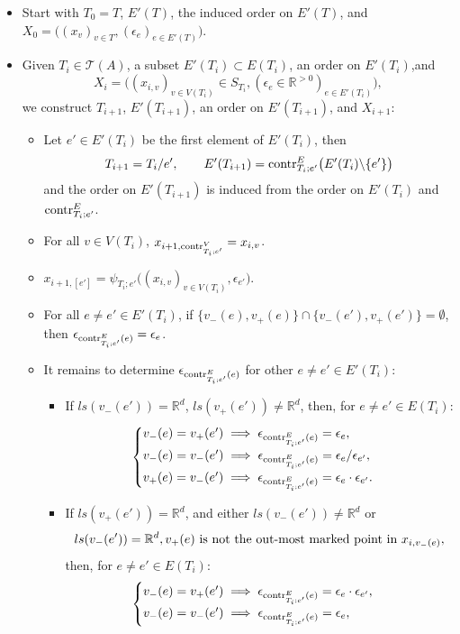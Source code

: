 \documentclass[11pt]{article}
\theoremstyle{definition}
\theoremstyle{remark}
\def\R{\mathbb{R}}
\def\cT{\mathcal{T}}
\def\tn#1{\textnormal{#1}}
\begin{document}
\begin{itemize}
\item Start with $T_0=T$, $E'(T)$, the induced order on $E'(T)$, and $X_0=\big((x_v)_{v\in T},(\epsilon_{e})_{e\in E'(T)}\big)$. 
\item Given $T_i\in\cT(A)$, a subset $E'(T_i)\subset E(T_i)$, an order on $E'(T_i)$,and $$X_i=\big((x_{i,v})_{v\in V(T_i)}\in S_{T_i},(\epsilon_{e}\in\R^{>0})_{e\in E'(T_i)}\big),$$ we construct $T_{i+1}$, $E'(T_{i+1})$, an order on $E'(T_{i+1})$, and $X_{i+1}$: 
\begin{itemize}
\item Let $e'\in E'(T_i)$ be the first element of $E'(T_i)$, then
$$T_{i+1}=T_i/e',\qquad E'(T_{i+1})=\tn{contr}^E_{T_i;e'}\big(E'(T_i)\backslash\{e'\}\big)$$
and the order on $E'(T_{i+1})$ is induced from the order on $E'(T_i)$ and $\tn{contr}^E_{T_i;e'}$.  
\item For all $v\in V(T_i)$, $x_{i+1,\tn{contr}^V_{T_i;e'}}=x_{i,v}$. 
\item $x_{i+1,[e']}=\psi_{T_i;e'}\big((x_{i,v})_{v\in V(T_i)},\epsilon_{e'}\big)$.
\item For all $e\neq e'\in E'(T_i)$, if $\{v_-(e),v_+(e)\}\cap \{v_-(e'),v_+(e')\}=\emptyset$, then $\epsilon_{\tn{contr}^E_{T_i;e'}(e)}=\epsilon_e$. 
\item It remains to determine $\epsilon_{\tn{contr}^E_{T_i;e'}(e)}$ for other $e\neq e'\in E'(T_i)$: 
\begin{itemize}
\item If $ls(v_-(e'))=\R^d$, $ls(v_+(e'))\neq\R^d$, then, for $e\neq e'\in E(T_i)$: 
$$\begin{cases}
v_-(e)=v_+(e')\implies \epsilon_{\tn{contr}^E_{T_i;e'}(e)}=\epsilon_e,\\
v_-(e)=v_-(e')\implies \epsilon_{\tn{contr}^E_{T_i;e'}(e)}=\epsilon_e/\epsilon_{e'},\\ 
v_+(e)=v_-(e')\implies \epsilon_{\tn{contr}^E_{T_i;e'}(e)}=\epsilon_e\cdot\epsilon_{e'}.
\end{cases}$$
\item If $ls(v_+(e'))=\R^d$, and either $ls(v_-(e'))\neq\R^d$ or 
$$ls(v_-(e'))=\R^d, v_+(e)\tn{ is not the out-most marked point in }x_{i,v_-(e)},$$  
then, for $e\neq e'\in E(T_i)$: 
$$\begin{cases}
v_-(e)=v_+(e')\implies \epsilon_{\tn{contr}^E_{T_i;e'}(e)}=\epsilon_e\cdot\epsilon_{e'},\\
v_-(e)=v_-(e')\implies \epsilon_{\tn{contr}^E_{T_i;e'}(e)}=\epsilon_e,\\ 

\end{cases}$$
\end{itemize}
\end{itemize}
\end{itemize}
\end{document}
